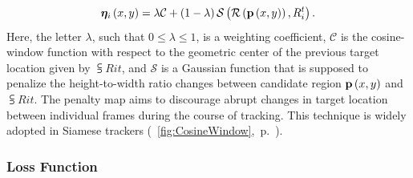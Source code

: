 \begin{equation}
    {\bm{\eta}_{i}} \left( x, y \right) =
    \lambda \mathcal{C} +
    \left( {1 - \lambda} \right) {\mathcal{S}} \left( 
        {\mathcal{R}} \left( 
            {\mathbf{p}} \left( x, y \right)
         \right),
        {R}_{i}^{t}
     \right).
\end{equation}
Here, the letter $\lambda$, such that $0 \leq \lambda \leq 1$, is a weighting coefficient, $\mathcal{C}$ is the cosine-window function with respect to the geometric center of the previous target location given by $\subsup{R}{i}{t}$, and $\mathcal{S}$ is a Gaussian function that is supposed to penalize the height-to-width ratio changes between candidate region ${\mathbf{p}} \left( x, y \right)$ and $\subsup{R}{i}{t}$. The penalty map aims to discourage abrupt changes in target location between individual frames during the course of tracking. This technique is widely adopted in Siamese trackers (\figtext{}~\ref{fig:CosineWindow},~p.~\pageref{fig:CosineWindow}).

\subsubsection{Loss Function}

